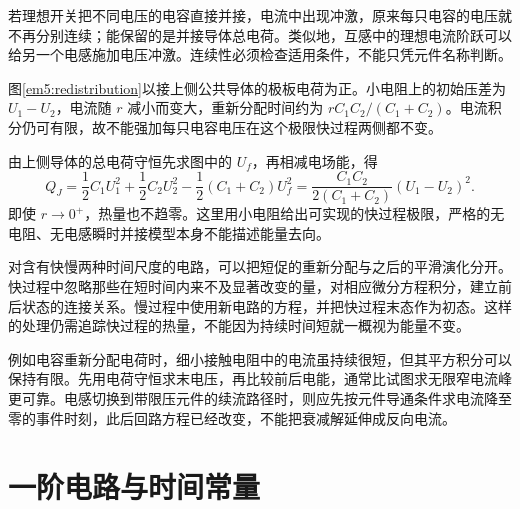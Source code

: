 若理想开关把不同电压的电容直接并接，电流中出现冲激，原来每只电容的电压就不再分别连续；能保留的是并接导体总电荷。类似地，互感中的理想电流阶跃可以给另一个电感施加电压冲激。连续性必须检查适用条件，不能只凭元件名称判断。

图\ref{em5:redistribution}以接上侧公共导体的极板电荷为正。小电阻上的初始压差为 $U_1-U_2$，电流随 $r$ 减小而变大，重新分配时间约为 $rC_1C_2/(C_1+C_2)$。电流积分仍可有限，故不能强加每只电容电压在这个极限快过程两侧都不变。

由上侧导体的总电荷守恒先求图中的 $U_f$，再相减电场能，得
\[Q_J=\frac12C_1U_1^2+\frac12C_2U_2^2-\frac12(C_1+C_2)U_f^2
=\frac{C_1C_2}{2(C_1+C_2)}(U_1-U_2)^2.\]
即使 $r\to0^+$，热量也不趋零。这里用小电阻给出可实现的快过程极限，严格的无电阻、无电感瞬时并接模型本身不能描述能量去向。


对含有快慢两种时间尺度的电路，可以把短促的重新分配与之后的平滑演化分开。快过程中忽略那些在短时间内来不及显著改变的量，对相应微分方程积分，建立前后状态的连接关系。慢过程中使用新电路的方程，并把快过程末态作为初态。这样的处理仍需追踪快过程的热量，不能因为持续时间短就一概视为能量不变。

例如电容重新分配电荷时，细小接触电阻中的电流虽持续很短，但其平方积分可以保持有限。先用电荷守恒求末电压，再比较前后电能，通常比试图求无限窄电流峰更可靠。电感切换到带限压元件的续流路径时，则应先按元件导通条件求电流降至零的事件时刻，此后回路方程已经改变，不能把衰减解延伸成反向电流。


\section{一阶电路与时间常量}

